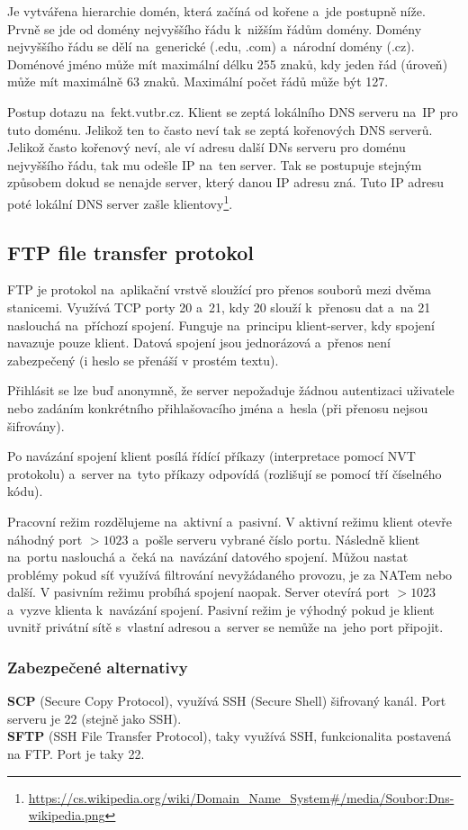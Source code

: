 Je vytvářena hierarchie domén, která začíná od kořene a~jde postupně níže. Prvně se jde od domény nejvyššího řádu k~nižším řádům domény. Domény nejvyššího řádu se dělí na~generické (.edu, .com) a~národní domény (.cz). Doménové jméno může mít maximální délku 255 znaků, kdy jeden řád (úroveň) může mít maximálně 63 znaků. Maximální počet řádů může být 127.

Postup dotazu na~fekt.vutbr.cz. Klient se zeptá lokálního DNS serveru na~IP pro tuto doménu. Jelikož ten to často neví tak se zeptá kořenových DNS serverů. Jelikož často kořenový neví, ale ví adresu další DNs serveru pro doménu nejvyššího řádu, tak mu odešle IP na~ten server. Tak se postupuje stejným způsobem dokud se nenajde server, který danou IP adresu zná. Tuto IP adresu poté lokální DNS server zašle klientovy\footnote{\url{https://cs.wikipedia.org/wiki/Domain_Name_System\#/media/Soubor:Dns-wikipedia.png}}.

\subsection{FTP file transfer protokol}

FTP je protokol na~aplikační vrstvě sloužící pro přenos souborů mezi dvěma stanicemi. Využívá TCP porty 20 a~21, kdy 20 slouží k~přenosu dat a~na 21 naslouchá na~příchozí spojení. Funguje na~principu klient-server, kdy spojení navazuje pouze klient. Datová spojení jsou jednorázová a~přenos není zabezpečený (i heslo se přenáší v prostém textu).

Přihlásit se lze buď anonymně, že server nepožaduje žádnou autentizaci uživatele nebo zadáním konkrétního přihlašovacího jména a~hesla (při přenosu nejsou šifrovány).

Po navázání spojení klient posílá řídící příkazy (interpretace pomocí NVT protokolu) a~server na~tyto příkazy odpovídá (rozlišují se pomocí tří číselného kódu).

Pracovní režim rozdělujeme na~aktivní a~pasivní. V aktivní režimu klient otevře náhodný port $> 1023$ a~pošle serveru vybrané číslo portu. Následně klient na~portu naslouchá a~čeká na~navázání datového spojení. Můžou nastat problémy pokud síť využívá filtrování nevyžádaného provozu, je za NATem nebo další. V pasivním režimu probíhá spojení naopak. Server otevírá port $> 1023$ a~vyzve klienta k~navázání spojení. Pasivní režim je výhodný pokud je klient uvnitř privátní sítě s~vlastní adresou a~server se nemůže na~jeho port připojit.

\subsubsection{Zabezpečené alternativy}
\textbf{SCP} (Secure Copy Protocol), využívá SSH (Secure Shell) šifrovaný kanál. Port serveru je 22 (stejně jako SSH).\\
\textbf{SFTP} (SSH File Transfer Protocol), taky využívá SSH, funkcionalita postavená na FTP. Port je taky 22.

